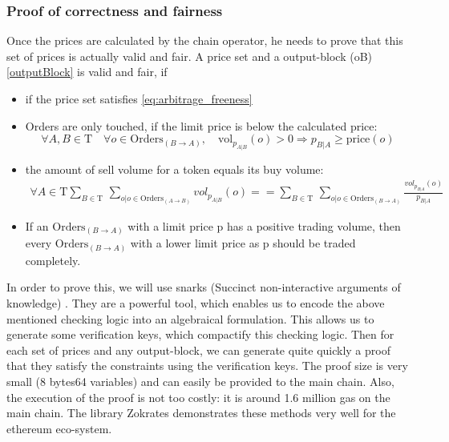 \documentclass[11pt,parskip=full]{scrartcl}%
\newcommand{\Tau}{\mathrm{T}}
\begin{document}
\subsubsection{Proof of correctness and fairness}
Once the prices are calculated by the chain operator, he needs to prove that this set of prices is actually valid and fair. A  price set and a output-block (oB) \ref{outputBlock} is valid and fair, if
\begin{itemize}

\item if the price set satisfies \ref{eq:arbitrage_freeness} 
\item Orders are only touched, if the limit price is below the calculated price:\newline
\begin{equation} \forall A,B \in \Tau \quad \forall o \in \text{Orders}_{(B\rightarrow A)}, \quad \text{vol}_{p_{A|B}}(o)>0 \Rightarrow p_{B|A}\geq \text{price}(o)
\end{equation}
\item the amount of sell volume for a token equals its buy volume: 
\begin{equation}
\begin{split}
\forall A \in \Tau \sum_{B\in \Tau} \,
\sum_{o| o\in \text{Orders}_{(A\rightarrow B)}} vol_{p_{A|B}}(o) == \sum_{B\in \Tau} \, \sum_{o| o\in \text{Orders}_{(B\rightarrow A)}} \frac{vol_{p_{B|A}}(o)}{p_{B|A}}
\end{split}
\end{equation}
\item If an $\text{Orders}_{(B\rightarrow A)}$ with a limit price p has a positive trading volume, then every $\text{Orders}_{(B\rightarrow A)}$ with a lower limit price as p should be traded completely.
\end{itemize}

In order to prove this, we will use snarks (Succinct non-interactive arguments of knowledge) \cite{snarks}. They are a powerful tool, which enables us to encode the above mentioned checking logic into an algebraical formulation. This allows us to generate some verification keys, which compactify this checking logic. Then for each set of prices and any output-block, we can generate quite quickly a proof that they satisfy the constraints using the verification keys. The proof size is very small (8 bytes64 variables) and can easily be provided to the main chain. Also, the execution of the proof is not too costly: it is around 1.6 million gas on the main chain. The library Zokrates demonstrates these methods very well for the ethereum eco-system.
\end{document}
